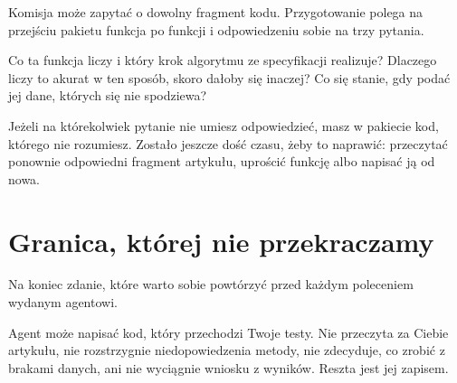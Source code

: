 Komisja może zapytać o dowolny fragment kodu. Przygotowanie polega na przejściu pakietu funkcja po funkcji i odpowiedzeniu sobie na trzy pytania.

Co ta funkcja liczy i który krok algorytmu ze specyfikacji realizuje? Dlaczego liczy to akurat w ten sposób, skoro dałoby się inaczej? Co się stanie, gdy podać jej dane, których się nie spodziewa?

Jeżeli na którekolwiek pytanie nie umiesz odpowiedzieć, masz w pakiecie kod, którego nie rozumiesz. Zostało jeszcze dość czasu, żeby to naprawić: przeczytać ponownie odpowiedni fragment artykułu, uprościć funkcję albo napisać ją od nowa.

\section{Granica, której nie przekraczamy}

Na koniec zdanie, które warto sobie powtórzyć przed każdym poleceniem wydanym agentowi.

Agent może napisać kod, który przechodzi Twoje testy. Nie przeczyta za Ciebie artykułu, nie rozstrzygnie niedopowiedzenia metody, nie zdecyduje, co zrobić z brakami danych, ani nie wyciągnie wniosku z wyników.  Reszta jest jej zapisem.
